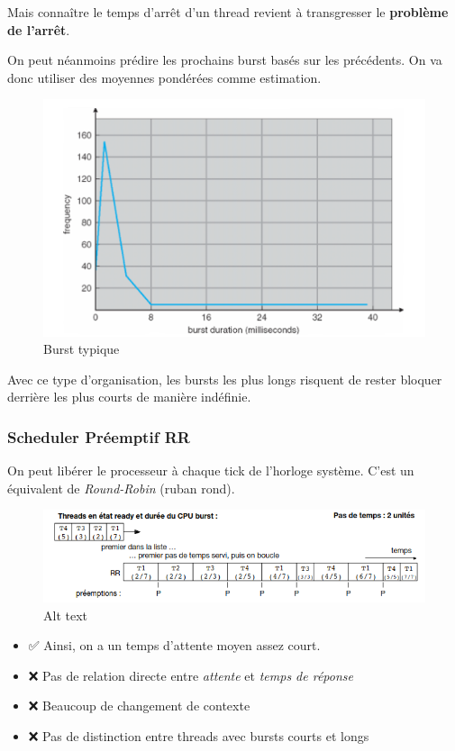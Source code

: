 Mais connaître le temps d'arrêt d'un thread revient à transgresser le
\textbf{problème de l'arrêt}.

On peut néanmoins prédire les prochains burst basés sur les précédents.
On va donc utiliser des moyennes pondérées comme estimation.

\begin{figure}
\centering
\includegraphics{image-31.png}
\caption{Burst typique}
\end{figure}

Avec ce type d'organisation, les bursts les plus longs risquent de
rester bloquer derrière les plus courts de manière indéfinie.

\subsubsection{Scheduler Préemptif RR}\label{scheduler-pruxe9emptif-rr}

On peut libérer le processeur à chaque tick de l'horloge système. C'est
un équivalent de \emph{Round-Robin} (ruban rond).

\begin{figure}
\centering
\includegraphics{image-32.png}
\caption{Alt text}
\end{figure}

\begin{itemize}
\tightlist
\item
  ✅ Ainsi, on a un temps d'attente moyen assez court.
\item
  ❌ Pas de relation directe entre \emph{attente} et \emph{temps de
  réponse}
\item
  ❌ Beaucoup de changement de contexte
\item
  ❌ Pas de distinction entre threads avec bursts courts et longs
\end{itemize}

